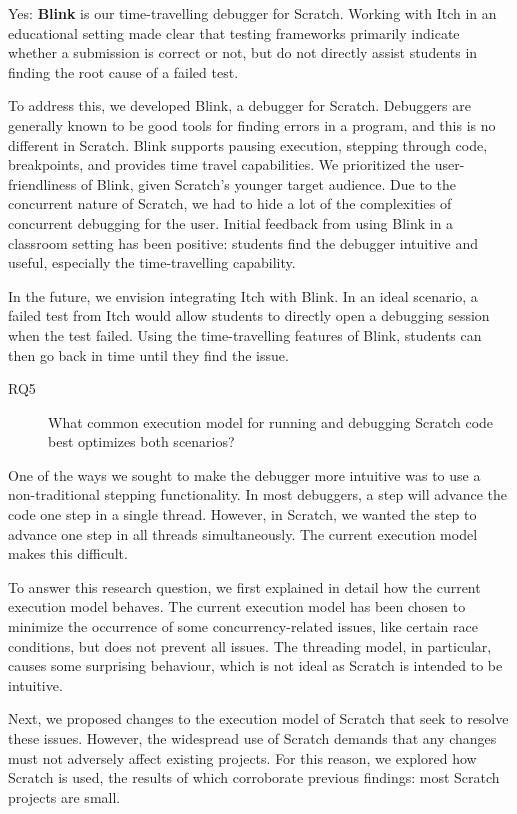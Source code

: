 \documentclass[main]{subfiles}
\begin{document}
Yes: \textbf{Blink} is our time-travelling debugger for Scratch.
Working with Itch in an educational setting made clear that testing frameworks primarily indicate whether a submission is correct or not, but do not directly assist students in finding the root cause of a failed test.

To address this, we developed Blink, a debugger for Scratch.
Debuggers are generally known to be good tools for finding errors in a program, and this is no different in Scratch.
Blink supports pausing execution, stepping through code, breakpoints, and provides time travel capabilities.
We prioritized the user-friendliness of Blink, given Scratch's younger target audience.
Due to the concurrent nature of Scratch, we had to hide a lot of the complexities of concurrent debugging for the user.
Initial feedback from using Blink in a classroom setting has been positive: students find the debugger intuitive and useful, especially the time-travelling capability.

In the future, we envision integrating Itch with Blink.
In an ideal scenario, a failed test from Itch would allow students to directly open a debugging session when the test failed.
Using the time-travelling features of Blink, students can then go back in time until they find the issue.

\begin{description}
    \item[RQ5] What common execution model for running and debugging Scratch code best optimizes both scenarios?
\end{description}

One of the ways we sought to make the debugger more intuitive was to use a non-traditional stepping functionality.
In most debuggers, a step will advance the code one step in a single thread.
However, in Scratch, we wanted the step to advance one step in all threads simultaneously.
The current execution model makes this difficult.

To answer this research question, we first explained in detail how the current execution model behaves.
The current execution model has been chosen to minimize the occurrence of some concurrency-related issues, like certain race conditions, but does not prevent all issues.
The threading model, in particular, causes some surprising behaviour, which is not ideal as Scratch is intended to be intuitive.

Next, we proposed changes to the execution model of Scratch that seek to resolve these issues.
However, the widespread use of Scratch demands that any changes must not adversely affect existing projects.
For this reason, we explored how Scratch is used, the results of which corroborate previous findings: most Scratch projects are small.
\end{document}
